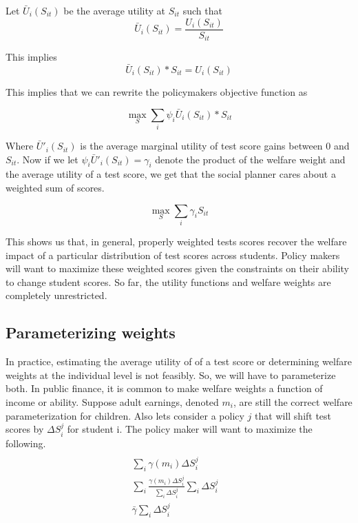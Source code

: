 \documentclass{article}
\theoremstyle{definition}
\theoremstyle{definition}
\theoremstyle{definition}
\begin{document}
\begin{definition}
Let $\bar{U}_{i}(S_{it})$ be the average utility  at $S_{it}$ such that 
\begin{equation}
     \bar{U}_{i}(S_{it}) = \frac{U_{i}(S_{it})}{S_{it}}
\end{equation}

This implies
\begin{equation}
    \bar{U}_{i}(S_{it}) * S_{it} = U_{i}(S_{it})
\end{equation}
\end{definition}

This implies that we can rewrite the policymakers objective function as 

\begin{equation}
   \max_S  \sum_i \psi_i \bar{U}_{i}(S_{it}) * S_{it}
\end{equation}


Where $\bar{U}'_{i}(S_{it}) $ is the average marginal utility of test score gains between $0$ and $S_{it}$. Now if we let $\psi_i \bar{U}'_{i}(S_{it}) = \gamma_i$ denote the product of the welfare weight and the average utility of a test score, we get that the social planner cares about a weighted sum of scores. 

\begin{equation}
   \max_S \sum_i \gamma_i S_{it}
\end{equation}

This shows us that, in general, properly weighted tests scores recover the welfare impact of a particular distribution of test scores across students. Policy makers will want to maximize these weighted scores given the constraints on their ability to change student scores. So far, the utility functions and welfare weights are completely unrestricted.

\subsection{Parameterizing weights}

In practice, estimating the average utility of of a test score or determining welfare weights at the individual level is not feasibly. So, we will have to parameterize both. In public finance, it is common to make welfare weights a function of income or ability. Suppose adult earnings, denoted $m_i$, are still the correct welfare parameterization for children. Also lets consider a policy $j$ that will shift test scores by $\Delta S_i^j$ for student i.  The policy maker will want to maximize the following. 
\large
\begin{align*}
   \\ \sum_i \gamma(m_i)\Delta S_i^j &
   \\ \sum_i \frac{\gamma(m_i)\Delta S_i^j}{\sum_i \Delta S_i^j} \sum_i \Delta S_i^j &
   \\ \bar{\gamma} \sum_i \Delta S_i^j &
\end{align*}
  
\end{document}
